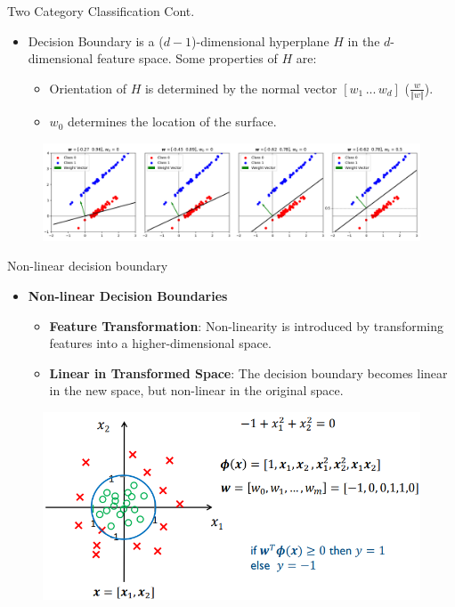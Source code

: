 \documentclass[serif, aspectratio=169]{beamer}
\begin{document}
\begin{frame}{Two Category Classification Cont.}
    \begin{itemize}\itemsep1.5em
        \item Decision Boundary is a (\(d - 1\))-dimensional hyperplane \(H\) in the \(d\)-dimensional feature space. Some properties of \(H\) are:
        \medskip
        \begin{itemize}\itemsep0.7em
            \item Orientation of \(H\) is determined by the normal vector \([w_1 \, ... \, w_d]\) (\(\frac{w}{\Vert w \Vert}\)).
            \item \(w_0\) determines the location of the surface.
        \end{itemize}
    \end{itemize}
    \begin{figure}
        \centering
        \includegraphics[width=\linewidth]{pic/Figure_25.png}
    \end{figure}
\end{frame}

\begin{frame}{Non-linear decision boundary}
    \begin{itemize}
        \item \textbf{Non-linear Decision Boundaries}
        \begin{itemize}\itemsep1em
            \item \justifying \textbf{Feature Transformation}: Non-linearity is introduced by transforming features into a higher-dimensional space.
            \item \justifying \textbf{Linear in Transformed Space}: The decision boundary becomes linear in the new space, but non-linear in the original space.
        \end{itemize}
    \end{itemize}
    \endminipage
    \hfill
        \begin{figure}[bh]
            \includegraphics[width=\textwidth]{pic/Figure_10.png}
        \end{figure}
    \endminipage
\end{frame}
\end{document}
